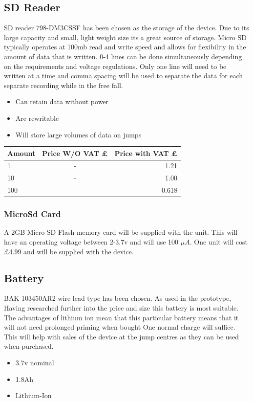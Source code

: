 \documentclass{report}
\begin{document}
\subsection{SD Reader}
SD reader 798-DM3CSSF has been chosen as the storage of the device. Due to its large capacity and small, light weight size its a great source of storage. Micro SD typically operates at 100mb read and write speed and allows for flexibility in the amount of data that is written. 0-4 lines can be done simultaneously depending on the requirements and voltage regulations. Only one line will need to be written at a time and comma spacing will be used to separate the data for each separate recording while in the free fall. 
\begin{itemize}
\item Can retain data without power
\item Are rewritable
\item Will store large volumes of data on jumps
\end{itemize}

\begin{center}
  \begin{tabular}{ | l | c | r |}
    \hline
    Amount & Price W/O VAT £ & Price with VAT £ \\ \hline
    1 & - & 1.21 \\ \hline
    10 & - & 1.00 \\ \hline
    100 & - & 0.618 \\ \hline
	\end{tabular}
\end{center}

\subsubsection{MicroSd Card}
A 2GB Micro SD Flash memory card will be supplied with the unit. This will have an operating voltage between 2-3.7v and will use 100 $\mu A$.
One unit will cost £4.99 and will be supplied with the device.


\subsection{Battery}
 BAK 103450AR2 wire lead type has been chosen. As used in the prototype, Having researched further into the price and size this battery is most suitable. The advantages of lithium ion mean that this particular battery means that it will not need prolonged priming when bought One normal charge will suffice. This will help with sales of the device at the jump centres as they can be used when purchased.
\begin{itemize}
\item 3.7v nominal
\item 1.8Ah
\item Lithium-Ion
\end{itemize}
\end{document}
